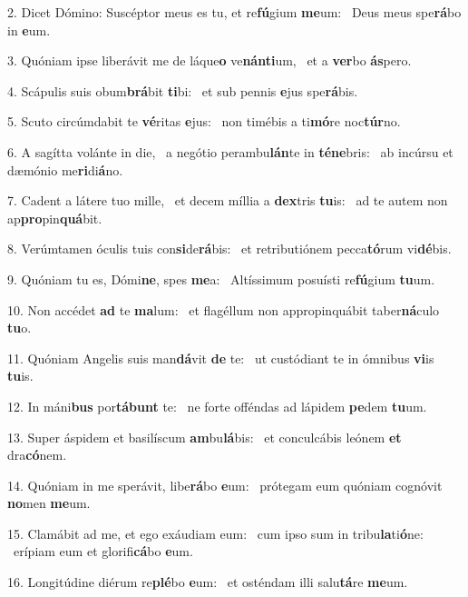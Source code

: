 2. Dicet Dómino: Suscéptor meus es tu, et re\textbf{fú}gium \textbf{me}um: \ast\  Deus meus spe\textbf{rá}bo in \textbf{e}um.\

3. Quóniam ipse liberávit me de láque\textbf{o} ve\textbf{nán}\textbf{ti}um, \ast\  et a \textbf{ver}bo \textbf{ás}pero.\

4. Scápulis suis obum\textbf{brá}bit \textbf{ti}bi: \ast\  et sub pennis \textbf{e}jus spe\textbf{rá}bis.\

5. Scuto circúmdabit te \textbf{vé}ritas \textbf{e}jus: \ast\  non timébis a ti\textbf{mó}re noc\textbf{túr}no.\

6. A sagítta volánte in die, \dag\  a negótio perambu\textbf{lán}te in \textbf{té}\textbf{ne}bris: \ast\  ab incúrsu et dæmónio me\textbf{ri}di\textbf{á}no.\

7. Cadent a látere tuo mille, \dag\  et decem míllia a \textbf{dex}tris \textbf{tu}is: \ast\  ad te autem non ap\textbf{pro}pin\textbf{quá}bit.\

8. Verúmtamen óculis tuis con\textbf{si}de\textbf{rá}bis: \ast\  et retributiónem pecca\textbf{tó}rum vi\textbf{dé}bis.\

9. Quóniam tu es, Dómi\textbf{ne}, spes \textbf{me}a: \ast\  Altíssimum posuísti re\textbf{fú}gium \textbf{tu}um.\

10. Non accédet \textbf{ad} te \textbf{ma}lum: \ast\  et flagéllum non appropinquábit taber\textbf{ná}culo \textbf{tu}o.\

11. Quóniam Angelis suis man\textbf{dá}vit \textbf{de} te: \ast\  ut custódiant te in ómnibus \textbf{vi}is \textbf{tu}is.\

12. In máni\textbf{bus} por\textbf{tá}\textbf{bunt} te: \ast\  ne forte offéndas ad lápidem \textbf{pe}dem \textbf{tu}um.\

13. Super áspidem et basilíscum \textbf{am}bu\textbf{lá}bis: \ast\  et conculcábis leónem \textbf{et} dra\textbf{có}nem.\

14. Quóniam in me sperávit, libe\textbf{rá}bo \textbf{e}um: \ast\  prótegam eum quóniam cognóvit \textbf{no}men \textbf{me}um.\

15. Clamábit ad me, et ego exáudiam eum: \dag\  cum ipso sum in tribu\textbf{la}ti\textbf{ó}ne: \ast\  erípiam eum et glorifi\textbf{cá}bo \textbf{e}um.\

16. Longitúdine diérum re\textbf{plé}bo \textbf{e}um: \ast\  et osténdam illi salu\textbf{tá}re \textbf{me}um.\

